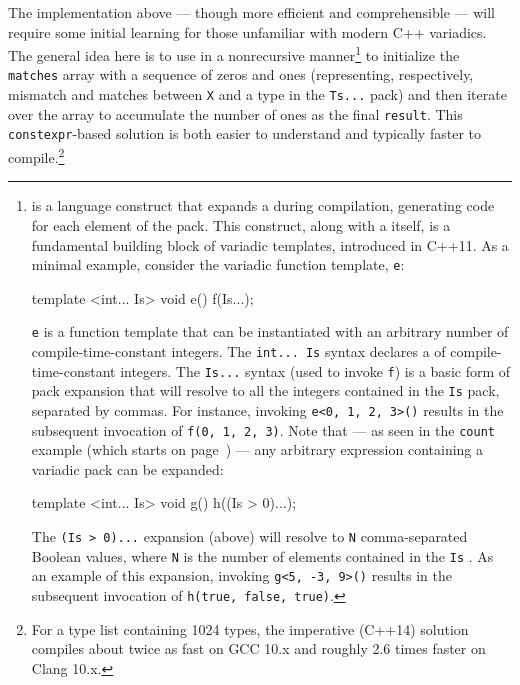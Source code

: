 \noindent The implementation above --- though more efficient and comprehensible
--- will require some initial learning for those unfamiliar with modern
C++ variadics. The general idea here \pagebreak%
 is to use 
in a nonrecursive manner{\cprotect\footnote{ is
a language construct that expands a  during
compilation, generating code for each element of the pack. This
construct, along with a  itself, is a
  fundamental building block of variadic templates,
  introduced in C++11. As a minimal example, consider the variadic
  function template, \lstinline!e!:

  \begin{emcppslisting}[style=footcode]
  template <int... Is> void e() { f(Is...); }
  \end{emcppslisting}

\noindent \lstinline!e! is a function template that can be instantiated
  with an arbitrary number of compile-time-constant integers. The
  \lstinline!int...!~\lstinline!Is! syntax declares a 
  of compile-time-constant integers. The \lstinline!Is...! syntax (used to
  invoke \lstinline!f!) is a basic form of pack expansion that will resolve
  to all the integers contained in the \lstinline!Is! pack, separated by
  commas. For instance, invoking
  \lstinline!e<0,!~\lstinline!1,!~\lstinline!2,!~\lstinline!3>()! results in the
  subsequent invocation of
  \lstinline!f(0,!~\lstinline!1,!~\lstinline!2,!~\lstinline!3)!. Note that --- as
  seen in the \lstinline!count! example (which starts on page~\pageref{relaxedconstexpr-countcode}) --- any arbitrary
  expression containing a variadic pack can be expanded:

  \begin{emcppslisting}[style=footcode]
  template <int... Is> void g() { h((Is > 0)...); }
  \end{emcppslisting}

\noindent The \lstinline!(Is!~\lstinline!>!~\lstinline!0)...! expansion (above) will
  resolve to \lstinline!N! comma-separated Boolean values, where \lstinline!N!
  is the number of elements contained in the \lstinline!Is!
  . As an example of this expansion, invoking
  \lstinline!g<5,!~\lstinline!-3,!~\lstinline!9>()! results in the subsequent invocation of \lstinline!h(true,!~\lstinline!false,!~\lstinline!true)!.}} to
initialize the \lstinline!matches! array with a sequence of zeros and ones
(representing, respectively, mismatch and matches between \lstinline!X! and
a type in the \lstinline!Ts...! pack) and then iterate over the array to
accumulate the number of ones as the final \lstinline!result!. This
\lstinline!constexpr!-based solution is both easier to understand and
typically faster to compile.{\cprotect\footnote{For a type list
containing 1024 types, the imperative (C++14) solution compiles about
twice as fast on GCC 10.x and roughly 2.6 times faster on Clang
  10.x.}}

